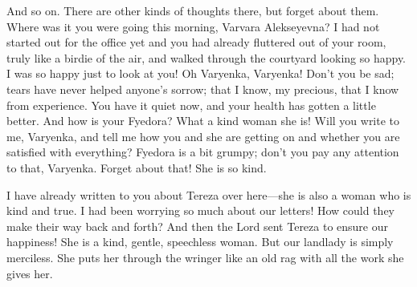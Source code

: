 And so on. There are other kinds of thoughts there, but forget about them. Where was it you were going this morning, Varvara Alekseyevna? I had not started out for the office yet and you had already fluttered out of your room, truly like a birdie of the air, and walked through the courtyard looking so happy. I was so happy just to look at you! Oh Varyenka, Varyenka! Don't you be sad; tears have never helped anyone's sorrow; that I know, my precious, that I know from experience. You have it quiet now, and your health has gotten a little better. And how is your Fyedora? What a kind woman she is! Will you write to me, Varyenka, and tell me how you and she are getting on and whether you are satisfied with everything? Fyedora is a bit grumpy; don't you pay any attention to that, Varyenka. Forget about that! She is so kind.

I have already written to you about Tereza over here---she is also a woman who is kind and true. I had been worrying so much about our letters! How could they make their way back and forth? And then the Lord sent Tereza to ensure our happiness! She is a kind, gentle, speechless woman. But our landlady is simply merciless. She puts her through the wringer like an old rag with all the work she gives her.

